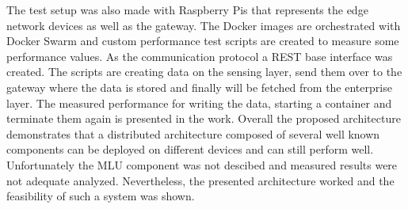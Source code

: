 The test setup was also made with Raspberry Pis that represents the edge network devices as well as the gateway.
The Docker images are orchestrated with Docker Swarm and custom performance test scripts are created to measure some performance values.
As the communication protocol a \ac{REST} base interface was created.
The scripts are creating data on the sensing layer, send them over to the gateway where the data is stored and finally will be fetched from the enterprise layer.\autocite[cf.][p. 1535]{Rufino:2017}
The measured performance for writing the data, starting a container and terminate them again is presented in the work.
Overall the proposed architecture demonstrates that a distributed architecture composed of several well known components can be deployed on different devices and can still perform well.
Unfortunately the \ac{MLU} component was not descibed and measured results were not adequate analyzed.
Nevertheless, the presented architecture worked and the feasibility of such a system was shown.

